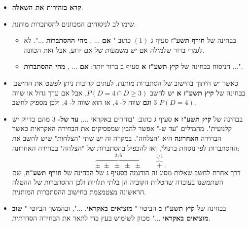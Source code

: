 \documentclass[12pt,a4paper]{article}
\begin{document}
\begin{itemize}
\item
\textbf{קרא בזהירות את השאלה}.

\item
שימו לב לניסוחים המכוונים להסתברות מותנת:
\begin{itemize}
\item
בבחינה של
\textbf{חורף תשע"ז}
סעיף ג
$(1)$
כתוב "%
\textbf{אם} $\ldots$ ,
\textbf{מהי ההסתברות} $\ldots$".
לא לגמרי ברור שלמילה אם יש משמעות של אם ידוע, אבל זאת הכוונה.
\item
הניסוח בבחינה של
\textbf{קיץ תשע"ז א}
סעיף ב ברור יותר:
\textbf{אם} $\ldots$ ,
\textbf{מהי ההסתברות} $\ldots$".
\end{itemize}

\item
כאשר יש חיתוך בחישוב של הסתברות מותנת, לעתים קרובות ניתן לפשט את החישב. בבחינה של
\textbf{קיץ תשע"ז א}
יש לחשב
$P(D=4\cap D\ge 3)$,
אבל אם ערך גדול או שווה
$3$
\textbf{וגם}
שווה ל-%
$4$,
אז הוא שווה ל-%
$4$, 
ולכן מספיק לחשב
$P(D=4)$.

\item
 בבחינה של
\textbf{קיץ תשע"ז א}
סעיף ג כתוב: "בוחרים באקראי
$\ldots$,
\textbf{עד של-}
$3$
מהם בדיוק יש קלנועית". מהמילים "עד ש-" אפשר להבין שמפסיקים את הבחירה האקראית כאשר הבחירה 
\textbf{האחרונה} 
היא "הצלחה". במקרה זה יש שתי "הצלחות" שיש לחשב את ההסתברות לפי נוסחת ברנולי, ואז להכפיל בהסתברות של "הצלחה" בבחירה האחרונה:
\[
\overbrace{\pm\;\pm\;\pm\;\pm\;\pm}^{2/5}\quad\quad \overbrace{+}^{1/1}\,.
\]
דרך אחרת לחשב שאלות מסוג זה הודגמה בסעיף ג של הבחינה של
\textbf{חורף תשע"ח},
שם השתמשנו בעובדה שהטלות הקוביה הן בלתי תלויות ולכן ההסתברות של ההטלה הראשונה מצטמצמת בחישוב ההסתברות המותנית.
\item
בבחינה של
\textbf{קיץ תשע"ז ב}
הביטוי "%
\textbf{מוציאים באקראי},
$\ldots$",
ובהמשך הביוטי "%
\textbf{שוב מוציאים באקראי}
$\ldots$"
מכוון לשימוש בעץ כדי לתאר את הבחירה הסדרתית.


\end{itemize}
\end{document}
